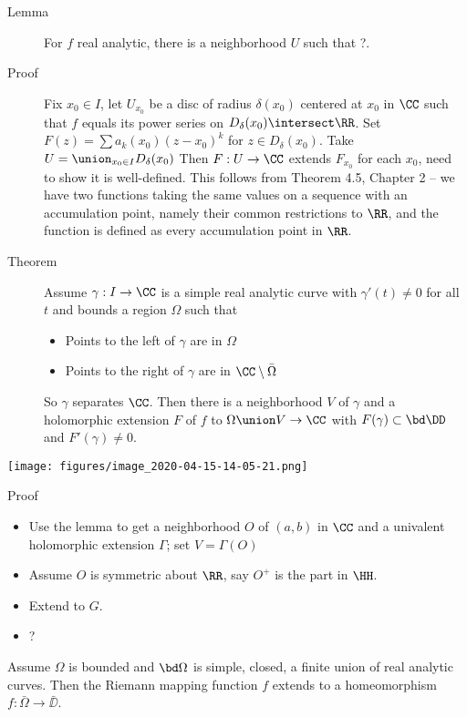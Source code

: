 \begin{description}
\item[Lemma]
For \(f\) real analytic, there is a neighborhood \(U\) such that ?.
\item[Proof]
Fix \(x_0 \in I\), let \(U_{x_0}\) be a disc of radius \(\delta(x_0)\)
centered at \(x_0\) in \(\CC\) such that \(f\) equals its power series
on \(D_\delta(x_0) \intersect \RR\). Set
\(F(z) = \sum a_k(x_0) (z - x_0)^k\) for \(z \in D_\delta(x_0)\). Take
\(U = \union_{x_0 \in I} D_\delta(x_0)\) Then \(F: U \to \CC\) extends
\(F_{x_0}\) for each \(x_0\), need to show it is well-defined. This
follows from Theorem 4.5, Chapter 2 -- we have two functions taking the
same values on a sequence with an accumulation point, namely their
common restrictions to \(\RR\), and the function is defined as every
accumulation point in \(\RR\).
\item[Theorem]
Assume \(\gamma: I\to \CC\) is a simple real analytic curve with
\(\gamma'(t) \neq 0\) for all \(t\) and bounds a region \(\Omega\) such
that

\begin{itemize}
\tightlist
\item
  Points to the left of \(\gamma\) are in \(\Omega\)
\item
  Points to the right of \(\gamma\) are in \(\CC \setminus \bar \Omega\)
\end{itemize}

So \(\gamma\) separates \(\CC\). Then there is a neighborhood \(V\) of
\(\gamma\) and a holomorphic extension \(F\) of \(f\) to
\(\Omega \union V \to \CC\) with \(F(\gamma) \subset \bd \DD\) and
\(F'(\gamma) \neq 0\).
\end{description}

\texttt{[image: figures/image\_2020-04-15-14-05-21.png]}

Proof

\begin{itemize}
\tightlist
\item
  Use the lemma to get a neighborhood \(O\) of \((a, b)\) in \(\CC\) and
  a univalent holomorphic extension \(\Gamma\); set \(V = \Gamma(O)\)
\item
  Assume \(O\) is symmetric about \(\RR\), say \(O^+\) is the part in
  \(\HH\).
\item
  Extend to \(G\).
\item
  ?
\end{itemize}

\begin{description}
\tightlist
\item[Theorem]
Assume \(\Omega\) is bounded and \(\bd \Omega\) is simple, closed, a
finite union of real analytic curves. Then the Riemann mapping function
\(f\) extends to a homeomorphism \(f:\bar\Omega \to \bar\DD\).
\end{description}

